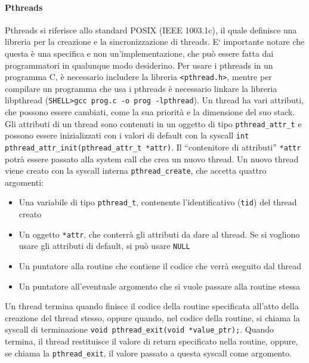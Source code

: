 \documentclass[a4paper]{article}
\begin{document}
\paragraph{Pthreads}  Pthreads si riferisce allo standard POSIX (IEEE 1003.1c), il quale definisce una libreria per la creazione e la sincronizzazione di threads. E` importante notare che questa è una specifica e non un'implementazione, che può essere fatta dai programmatori in qualunque modo desiderino. \newline
Per usare i pthreads in un programma C, è necessario includere la libreria \texttt{\textless pthread.h\textgreater}, mentre per compilare un programma che usa i pthreads è necessario linkare la libreria libpthread (\texttt{SHELL\textgreater gcc prog.c -o prog -lpthread}). \newline
Un thread ha vari attributi, che possono essere cambiati, come la sua priorità e la dimensione del suo stack. Gli attributi di un thread sono contenuti in un oggetto di tipo \texttt{pthread\_attr\_t} e possono essere inizializzati con i valori di default con la syscall \texttt{int pthread\_attr\_init(pthread\_attr\_t *attr)}. Il ``contenitore di attributi'' \texttt{*attr} potrà essere passato alla system call che crea un nuovo thread. \newline
Un nuovo thread viene creato con la syscall interna \texttt{pthread\_create}, che accetta quattro argomenti:
\begin{itemize}
    \item Una variabile di tipo \texttt{pthread\_t}, contenente l'identificativo (\texttt{tid}) del thread creato
    \item Un oggetto \texttt{*attr}, che conterrà gli attributi da dare al thread. Se si vogliono usare gli attributi di default, si può usare \texttt{NULL}
    \item Un puntatore alla routine che contiene il codice che verrà eseguito dal thread
    \item Un puntatore all'eventuale argomento che si vuole passare alla routine stessa
\end{itemize}
Un thread termina quando finisce il codice della routine specificata all'atto della creazione del thread stesso, oppure quando, nel codice della routine, si chiama la syscall di terminazione \texttt{void pthread\_exit(void *value\_ptr);}.\newline
Quando termina, il thread restituisce il valore di return specificato nella routine, oppure, se chiama la \texttt{pthread\_exit}, il valore passato a questa syscall come argomento. \newline
\end{document}
